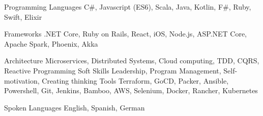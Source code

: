 

\begin{cvskills}

  \cvskill
    {Programming Languages} %
    {C\#, Javascript (ES6), Scala, Java, Kotlin, F\#, Ruby, Swift, Elixir } %

  \cvskill
    {Frameworks} %
    {.NET Core, Ruby on Rails, React, iOS, Node.js, ASP.NET Core, Apache Spark, Phoenix, Akka} %

  \cvskill
    {Architecture} %
    {Microservices, Distributed Systems, Cloud computing, TDD, CQRS, Reactive Programming } %
  \cvskill
    {Soft Skills} %
    {Leadership, Program Management, Self-motivation, Creating thinking} %
  \cvskill
    {Tools} %
    {Terraform, GoCD, Packer, Ansible, Powershell, Git, Jenkins, Bamboo, AWS, Selenium, Docker, Rancher, Kubernetes} %

  \cvskill
    {Spoken Languages} %
    { English, Spanish, German} %

\end{cvskills}
